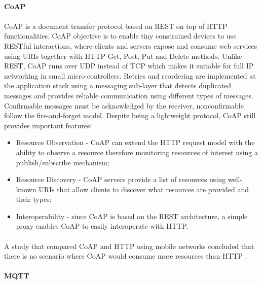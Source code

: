 \paragraph{\textbf{\gls{CoAP}}}
\paragraph{}
	\gls{CoAP} \cite{Shelby2014} is a document transfer protocol based on \gls{REST} on top of \gls{HTTP} functionalities. \gls{CoAP} objective is to enable tiny constrained devices to use RESTful interactions, where clients and servers expose and consume web services using \gls{URIs} together with  \gls{HTTP} Get, Post, Put and Delete methods. Unlike \gls{REST}, \gls{CoAP} runs over \gls{UDP} instead of \gls{TCP} which makes it suitable for full IP networking in small micro-controllers. Retries and reordering are implemented at the application stack using a messaging sub-layer that detects duplicated messages and provides reliable communication using different types of messages. Confirmable messages must be acknowledged by the receiver, nonconfirmable follow the fire-and-forget model. Despite being a lightweight protocol, \gls{CoAP} still provides important features:
	
\begin{itemize}
	\item Resource Observation - \gls{CoAP} can extend the \gls{HTTP} request model with the ability to observe a resource therefore monitoring resources of interest using a publish/subscribe mechanism;\\
	\item Resource Discovery - \gls{CoAP} servers provide a list of resources using well-known {URIs} that allow clients to discover what resources are provided and their types;\\
	\item Interoperability - since \gls{CoAP} is based on the \gls{REST} architecture, a simple proxy enables \gls{CoAP} to easily interoperate with \gls{HTTP}.
\end{itemize}

\paragraph{}
A study that compared \gls{CoAP} and \gls{HTTP} using mobile networks concluded that there is no scenario where \gls{CoAP} would consume more resources than \gls{HTTP} \cite{Savolainen2014}.

\paragraph{\textbf{\gls{MQTT}}}

